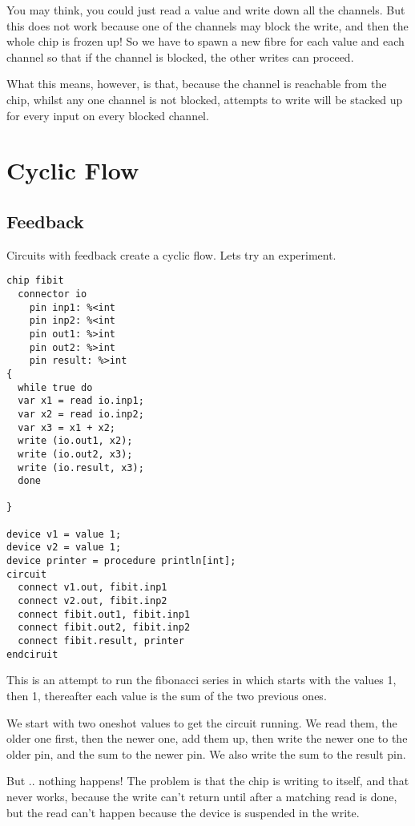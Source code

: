 \documentclass[oneside]{book}
\begin{document}
You may think, you could just read a value and write down all
the channels. But this does not work because one of the channels
may block the write, and then the whole chip is frozen up!
So we have to spawn a new fibre for each value and each channel
so that if the channel is blocked, the other writes can proceed.

What this means, however, is that, because the channel is reachable
from the chip, whilst any one channel is not blocked, attempts to write
will be stacked up for every input on every blocked channel. 

\chapter{Cyclic Flow}
\section{Feedback}
Circuits with feedback create a cyclic flow. Lets try an experiment.

\begin{verbatim}
chip fibit 
  connector io
    pin inp1: %<int
    pin inp2: %<int
    pin out1: %>int
    pin out2: %>int
    pin result: %>int
{
  while true do
  var x1 = read io.inp1;
  var x2 = read io.inp2;
  var x3 = x1 + x2;
  write (io.out1, x2);
  write (io.out2, x3);
  write (io.result, x3);
  done

}

device v1 = value 1;
device v2 = value 1;
device printer = procedure println[int];
circuit
  connect v1.out, fibit.inp1
  connect v2.out, fibit.inp2
  connect fibit.out1, fibit.inp1
  connect fibit.out2, fibit.inp2
  connect fibit.result, printer
endciruit
\end{verbatim}

This is an attempt to run the fibonacci series in which starts with
the values 1, then 1, thereafter each value is the sum of the two
previous ones.

We start with two oneshot values to get the circuit running.
We read them, the older one first, then the newer one,
add them up, then write the newer one to the older pin,
and the sum to the newer pin. We also write the sum to the result pin.

But .. nothing happens! The problem is that the chip is writing
to itself, and that never works, because the write can't return
until after a matching read is done, but the read can't happen
because the device is suspended in the write.
\end{document}
